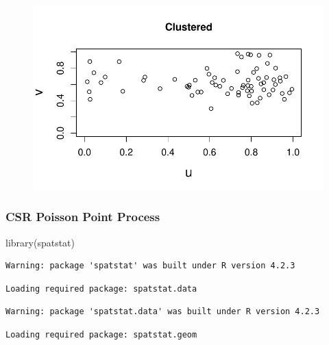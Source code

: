 \documentclass[
  letterpaper,
  DIV=11,
  numbers=noendperiod]{scrartcl}
\newenvironment{Shaded}{\begin{snugshade}}{\end{snugshade}}
\newcommand{\FunctionTok}[1]{\textcolor[rgb]{0.28,0.35,0.67}{#1}}
\newcommand{\NormalTok}[1]{\textcolor[rgb]{0.00,0.23,0.31}{#1}}
\begin{document}
\begin{figure}[H]

{\centering \includegraphics{robby_homework_1_files/figure-pdf/unnamed-chunk-4-1.pdf}

}

\end{figure}

\hypertarget{csr-poisson-point-process}{%
\subsubsection{CSR Poisson Point
Process}\label{csr-poisson-point-process}}

\begin{Shaded}
\begin{Highlighting}[]
\FunctionTok{library}\NormalTok{(spatstat)}
\end{Highlighting}
\end{Shaded}

\begin{verbatim}
Warning: package 'spatstat' was built under R version 4.2.3
\end{verbatim}

\begin{verbatim}
Loading required package: spatstat.data
\end{verbatim}

\begin{verbatim}
Warning: package 'spatstat.data' was built under R version 4.2.3
\end{verbatim}

\begin{verbatim}
Loading required package: spatstat.geom
\end{verbatim}
\end{document}
